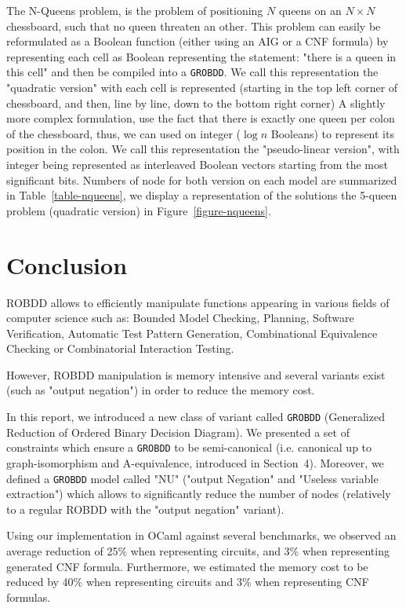 \documentclass[a4paper,10pt]{article}
\newcommand{\GroBdd}{\texttt{GROBDD}}
\begin{document}
The N-Queens problem, is the problem of positioning $N$ queens on an $N\times N$ chessboard, such that no queen threaten an other.
This problem can easily be reformulated as a Boolean function (either using an AIG or a CNF formula) by representing each cell as Boolean representing the statement: "there is a queen in this cell" and then be compiled into a \GroBdd{}.
We call this representation the "quadratic version" with each cell is represented (starting in the top left corner of chessboard, and then, line by line, down to the bottom right corner)
A slightly more complex formulation, use the fact that there is exactly one queen per colon of the chessboard, thus, we can used on integer ($\log n$ Booleans) to represent its position in the colon.
We call this representation the "pseudo-linear version", with integer being represented as interleaved Boolean vectors starting from the most significant bits.
Numbers of node for both version on each model are summarized in Table~\ref{table-nqueens}, we display a representation of the solutions the 5-queen problem (quadratic version) in Figure~\ref{figure-nqueens}.



\section{Conclusion}

ROBDD allows to efficiently manipulate functions appearing in various fields of computer science such as: Bounded Model Checking, Planning, Software Verification, Automatic Test Pattern Generation, Combinational Equivalence Checking or Combinatorial Interaction Testing.

However, ROBDD manipulation is memory intensive and several variants exist (such as "output negation") in order to reduce the memory cost.

In this report, we introduced a new class of variant called \GroBdd{} (Generalized Reduction of Ordered Binary Decision Diagram). We presented a set of constraints which ensure a \GroBdd{} to be semi-canonical (i.e. canonical up to graph-isomorphism and A-equivalence, introduced in Section~4).
Moreover, we defined a \GroBdd{} model called "NU" ("output Negation" and "Useless variable extraction") which allows to significantly reduce the number of nodes (relatively to a regular ROBDD with the "output negation" variant).


Using our implementation in OCaml against several benchmarks, we observed an average reduction of 25\% when representing circuits, and 3\% when representing generated CNF formula.
Furthermore, we estimated the memory cost to be reduced by 40\% when representing circuits and 3\% when representing CNF formulas.
\end{document}

